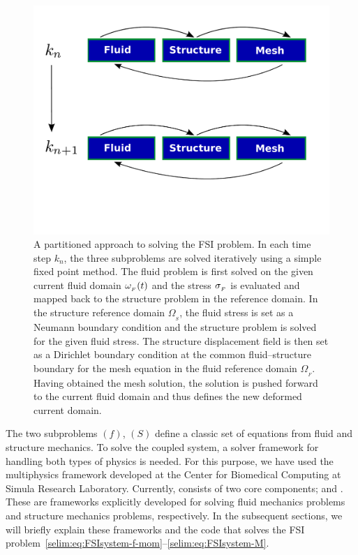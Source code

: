 \begin{figure}
\bwfig
  \centering
  \includegraphics[width=\largefig]{chapters/selim/pdf/primal.pdf}
  \caption{A partitioned approach to solving the FSI problem. In each
    time step $k_n$, the three subproblems are solved iteratively
    using a simple fixed point method. The fluid problem is first
    solved on the given current fluid domain $\omega_{_{F}}(t)$ and the stress
    $\sigma_{_{F}}$ is evaluated and mapped back to the
    structure problem in the reference domain. In the structure
    reference domain $\Omega_{_{S}}$, the fluid stress is set as a
    Neumann boundary condition and the structure problem is solved for the
    given fluid stress. The structure displacement field is then set
    as a Dirichlet boundary condition at the common fluid--structure
    boundary for the mesh equation in the fluid reference domain
    $\Omega_{_{F}}$. Having obtained the mesh solution, the solution
    is pushed forward to the current fluid domain and thus defines the
    new deformed current domain.}
  \label{selim:fig:fp}
  \vspace*{24pt}
\end{figure}

The two subproblems $(f)$, $(S)$ define a
classic set of equations from fluid and structure mechanics. To solve the
coupled system, a solver framework for handling both types of physics
is needed. For this purpose, we have used the multiphysics framework
 developed at the Center for Biomedical Computing at
Simula Research Laboratory. Currently,  consists of
two core components;  and .  These are
frameworks explicitly developed for solving fluid mechanics problems and
structure mechanics problems, respectively.  In the subsequent sections,
we will briefly explain these frameworks and the code that solves the
FSI problem~\eqref{selim:eq:FSIsystem-f-mom}--\eqref{selim:eq:FSIsystem-M}.


